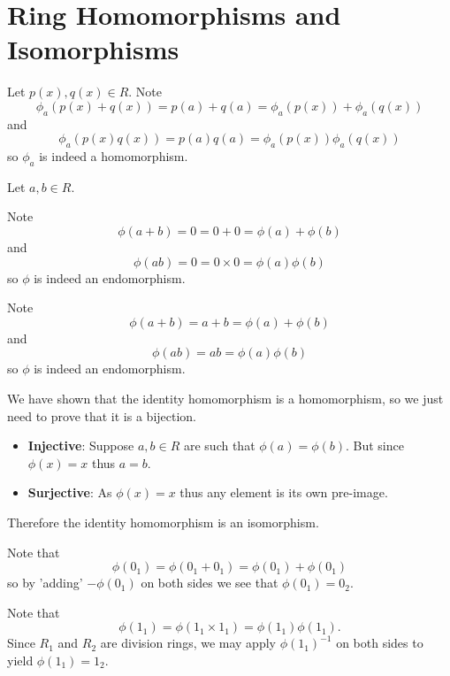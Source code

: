 \section{Ring Homomorphisms and Isomorphisms}
\begin{questions}
    \item Let $p(x), q(x) \in R$. Note
    \[
        \phi_a(p(x)+q(x)) = p(a) + q(a) = \phi_a(p(x)) + \phi_a(q(x))
    \]
    and
    \[
        \phi_a(p(x)q(x)) = p(a)q(a) = \phi_a(p(x))\phi_a(q(x))
    \]
    so $\phi_a$ is indeed a homomorphism.

    \item Let $a, b \in R$.
    \begin{partquestions}{\alph*}
        \item Note
        \[
            \phi(a+b) = 0 = 0 + 0 = \phi(a) + \phi(b)
        \]
        and
        \[
            \phi(ab) = 0 = 0\times0 = \phi(a)\phi(b)
        \]
        so $\phi$ is indeed an endomorphism.

        \item Note
        \[
            \phi(a+b) = a + b = \phi(a) + \phi(b)
        \]
        and
        \[
            \phi(ab) = ab = \phi(a)\phi(b)
        \]
        so $\phi$ is indeed an endomorphism.
    \end{partquestions}

    \item We have shown that the identity homomorphism is a homomorphism, so we just need to prove that it is a bijection.
    \begin{itemize}
        \item \textbf{Injective}: Suppose $a, b \in R$ are such that $\phi(a) = \phi(b)$. But since $\phi(x) = x$ thus $a = b$.
        \item \textbf{Surjective}: As $\phi(x) = x$ thus any element is its own pre-image.
    \end{itemize}
    Therefore the identity homomorphism is an isomorphism.

    \item Note that
    \[
        \phi(0_1) = \phi(0_1 + 0_1) = \phi(0_1) + \phi(0_1)
    \]
    so by 'adding' $-\phi(0_1)$ on both sides we see that $\phi(0_1) = 0_2$.

    \item Note that
    \[
        \phi(1_1) = \phi(1_1 \times 1_1) = \phi(1_1)\phi(1_1).
    \]
    Since $R_1$ and $R_2$ are division rings, we may apply $\phi(1_1)^{-1}$ on both sides to yield $\phi(1_1) = 1_2$.


\end{questions}
